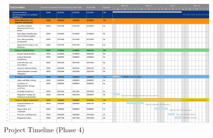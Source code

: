     \begin{figure}
        \centering
        \includegraphics[width=1\textwidth]{components/images/timeline4.png}
        \caption{Project Timeline (Phase 4)}
        \label{fig:recomm}
    \end{figure}